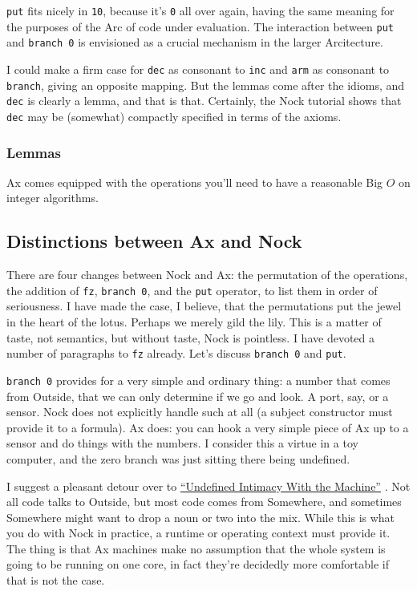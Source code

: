 \documentclass[twoside]{article}
\begin{document}
\texttt{put} fits nicely in \texttt{10}, because it's \texttt{0} all over again, having the same meaning for the purposes of the Arc of code under evaluation. The interaction between \texttt{put} and \texttt{branch 0} is envisioned as a crucial mechanism in the larger Arcitecture. 

I could make a firm case for \texttt{dec} as consonant to \texttt{inc} and \texttt{arm} as consonant to \texttt{branch}, giving an opposite mapping. But the lemmas come after the idioms, and \texttt{dec} is clearly a lemma, and that is that. Certainly, the Nock tutorial shows that \texttt{dec} may be (somewhat) compactly specified in terms of the axioms.

\subsubsection{Lemmas}

Ax comes equipped with the operations you'll need to have a reasonable Big $O$ on integer algorithms.


\subsection{Distinctions between Ax and Nock}

There are four changes between Nock and Ax: the permutation of the operations, the addition of \texttt{fz}, \texttt{branch 0}, and the \texttt{put} operator, to list them in order of seriousness. I have made the case, I believe, that the permutations put the jewel in the heart of the lotus. Perhaps we merely gild the lily. This is a matter of taste, not semantics, but without taste, Nock is pointless. I have devoted a number of paragraphs to \texttt{fz} already. Let's discuss \texttt{branch 0} and \texttt{put}.

\texttt{branch 0} provides for a very simple and ordinary thing: a number that comes from Outside, that we can only determine if we go and look. A port, say, or a sensor. Nock does not explicitly handle such at all (a subject constructor must provide it to a formula). Ax does: you can hook a very simple piece of Ax up to a sensor and do things with the numbers. I consider this a virtue in a toy computer, and the zero branch was just sitting there being undefined. 

I suggest a pleasant detour over to \href{http://thoughtmesh.net/publish/367.php}{``Undefined Intimacy With the Machine''} \citep{Buswell2010}. %
Not all code talks to Outside, but most code comes from Somewhere, and sometimes Somewhere might want to drop a noun or two into the mix. While this is what you do with Nock in practice, a runtime or operating context must provide it. The thing is that Ax machines make no assumption that the whole system is going to be running on one core, in fact they're decidedly more comfortable if that is not the case. 
\end{document}

